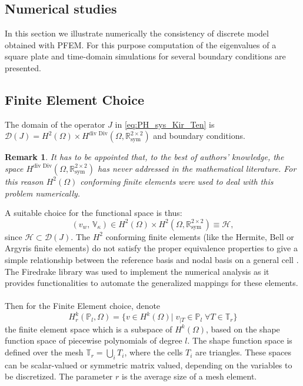 \documentclass[preprint,12pt]{elsarticle}
\newtheorem{remark}{Remark}
\newcommand{\revTwo}[1]{\textcolor{red!80!black}{#1}}
\begin{document}
\revTwo{
\section{Numerical studies}
\label{sec:Num}
In this section we illustrate numerically the consistency of discrete model obtained with PFEM. For this purpose computation of the eigenvalues of a square plate and time-domain simulations for several boundary conditions are presented. 
\subsection{Finite Element Choice}
The domain of the operator $J$ in \eqref{eq:PH_sys_Kir_Ten} is $\mathcal{D}(J) = H^{2}(\Omega) \times  H^{\text{div Div}}(\Omega, \mathbb{R}^{2 \times 2}_{\text{sym}})$ and boundary conditions. 
\begin{remark}
	It has to be appointed that, to the best of authors' knowledge, the space $H^{\text{div Div}}(\Omega, \mathbb{R}^{2 \times 2}_{\text{sym}})$ has never addressed in the mathematical literature. For this reason $H^{2}(\Omega)$ conforming finite elements were used to deal with this problem numerically. 
\end{remark}
A suitable choice for the functional space is thus:
\begin{equation}
(v_w, \,\mathbb{V}_\kappa) \in H^{2}(\Omega) \times H^{2}(\Omega, \mathbb{R}^{2 \times 2}_{\text{sym}}) \equiv \mathscr{H},
\end{equation}
since $\mathscr{H} \subset \mathcal{D}(J)$. 
The $H^2$ conforming finite elements (like the Hermite, Bell or Argyris finite elements) do not satisfy the proper equivalence properties to give a simple relationship between the reference basis and nodal basis on a general cell \cite{KirbyFE}. The Firedrake library \cite{firedrake} was used to implement the numerical analysis as it provides functionalities to automate the generalized mappings for these elements. \\ \\
Then for the Finite Element choice, denote
\[ H_r^k(\mathbb{P}_l, \Omega) = \{ v \in H^k(\Omega)|\; v_{|T} \in \mathbb{P}_l \; \forall T \in \mathbb{T}_r \} 
\]
the finite element space which is a subspace of $H^k(\Omega)$, based on the shape function space of piecewise polynomials of degree $l$. The shape function space is defined over the mesh $\mathbb{T}_r = \bigcup_i T_i$, where the cells $T_i$ are triangles. These spaces can be scalar-valued or symmetric matrix valued, depending on the variables to be discretized. The parameter $r$ is the average size of a mesh element.
}
\end{document}
